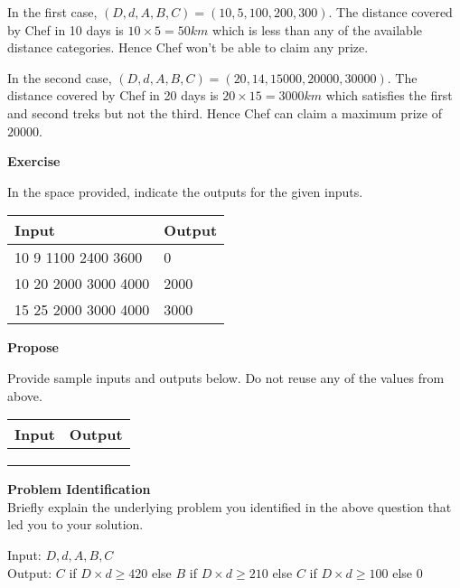 \documentclass[a4paper]{exam}
\newcommand\heading[1]{\textbf{#1}}
\begin{document}
\begin{questions}
    In the first case, $(D,d,A,B,C)=(10,5,100,200,300)$. The distance covered by Chef in 10 days is $10\times5=50km$ which is less than any of the available distance categories. Hence Chef won't be able to claim any prize.

    In the second case, $(D,d,A,B,C)=(20,14,15000,20000,30000)$. The distance covered by Chef in 20 days is $20\times15=3000km$ which satisfies the first and second treks but not the third. Hence Chef can claim a maximum prize of $20000$.

    \heading{Exercise}

    In the space provided, indicate the outputs for the given inputs.

    \begin{tabularx}{\textwidth}{|X|X|}
        \rowcolor{gray!50}
        \hline
        Input      & Output \\ \hline\hline
        10 9 1100 2400 3600 & 0      \\\hline
        10 20 2000 3000 4000 & 2000      \\\hline
        15 25 2000 3000 4000 & 3000      \\\hline
    \end{tabularx}

    \heading{Propose}

    Provide sample inputs and outputs below. Do not reuse any of the values from above.

    \begin{tabularx}{\textwidth}{|X|X|}
        \rowcolor{gray!50}
        \hline
        Input & Output \\ \hline\hline
              &        \\\hline
              &        \\\hline
              &        \\\hline
    \end{tabularx}

    \heading{Problem Identification}\\
    Briefly explain the underlying problem you identified in the above question that led you to your solution.

  \begin{mdframed}
    Input: $D,d,A,B,C$\\
    Output: $C$ if $D\times d \geq 420$ else $B$ if $D\times d \geq 210$ else $C$ if $D\times d \geq 100$ else $0$
  \end{mdframed}


\end{questions}
\end{document}
